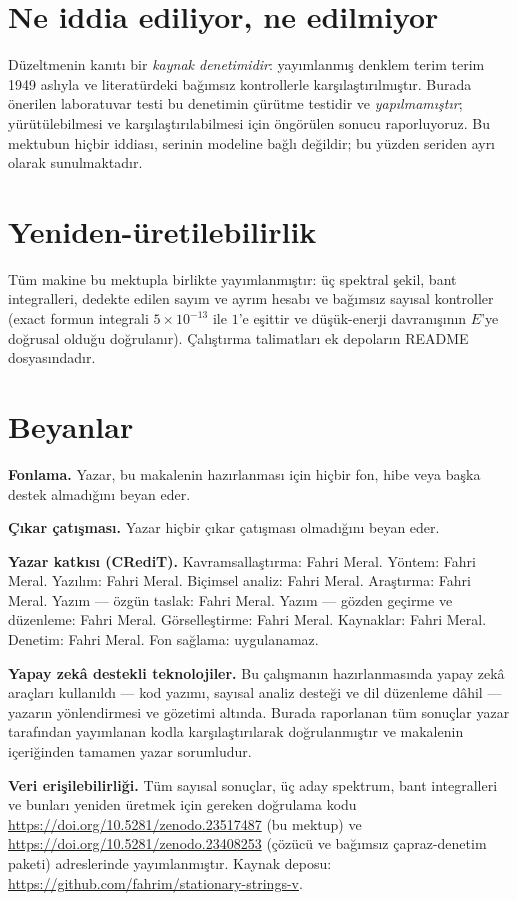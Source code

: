 \documentclass[twocolumn]{svjour3}
\begin{document}
\section{Ne iddia ediliyor, ne edilmiyor}
Düzeltmenin kanıtı bir \emph{kaynak denetimidir}: yayımlanmış denklem
terim terim 1949 aslıyla ve literatürdeki bağımsız kontrollerle
karşılaştırılmıştır. Burada önerilen laboratuvar testi bu denetimin
çürütme testidir ve \emph{yapılmamıştır}; yürütülebilmesi ve
karşılaştırılabilmesi için öngörülen sonucu raporluyoruz. Bu mektubun
hiçbir iddiası, serinin modeline bağlı değildir; bu yüzden seriden ayrı
olarak sunulmaktadır.

\section{Yeniden-üretilebilirlik}
Tüm makine bu mektupla birlikte yayımlanmıştır: üç spektral şekil, bant
integralleri, dedekte edilen sayım ve ayrım hesabı ve bağımsız sayısal
kontroller (exact formun integrali $5\times10^{-13}$ ile $1$'e eşittir ve
düşük-enerji davranışının $E$'ye doğrusal olduğu doğrulanır).
Çalıştırma talimatları ek depoların README dosyasındadır.

\section*{Beyanlar}

\textbf{Fonlama.} Yazar, bu makalenin hazırlanması için hiçbir fon, hibe
veya başka destek almadığını beyan eder.

\textbf{Çıkar çatışması.} Yazar hiçbir çıkar çatışması olmadığını beyan eder.

\textbf{Yazar katkısı (CRediT).} Kavramsallaştırma: Fahri Meral. Yöntem:
Fahri Meral. Yazılım: Fahri Meral. Biçimsel analiz: Fahri Meral. Araştırma:
Fahri Meral. Yazım — özgün taslak: Fahri Meral. Yazım — gözden geçirme ve
düzenleme: Fahri Meral. Görselleştirme: Fahri Meral. Kaynaklar: Fahri Meral.
Denetim: Fahri Meral. Fon sağlama: uygulanamaz.

\textbf{Yapay zekâ destekli teknolojiler.} Bu çalışmanın hazırlanmasında
yapay zekâ araçları kullanıldı — kod yazımı, sayısal analiz desteği ve dil
düzenleme dâhil — yazarın yönlendirmesi ve gözetimi altında. Burada
raporlanan tüm sonuçlar yazar tarafından yayımlanan kodla karşılaştırılarak
doğrulanmıştır ve makalenin içeriğinden tamamen yazar sorumludur.

\textbf{Veri erişilebilirliği.} Tüm sayısal sonuçlar, üç aday spektrum, bant
integralleri ve bunları yeniden üretmek için gereken doğrulama kodu
\url{https://doi.org/10.5281/zenodo.23517487} (bu mektup) ve
\url{https://doi.org/10.5281/zenodo.23408253} (çözücü ve bağımsız
çapraz-denetim paketi) adreslerinde yayımlanmıştır. Kaynak deposu:
\url{https://github.com/fahrim/stationary-strings-v}.

\nocite{ps95}



\end{document}
